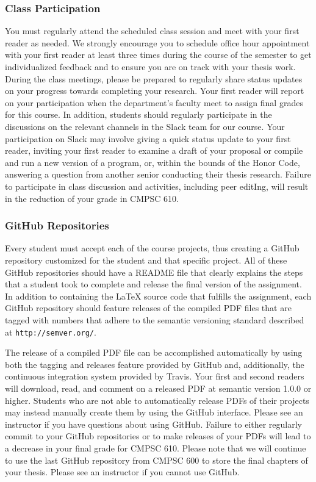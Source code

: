 \documentclass[11pt]{article}
\newcommand{\url}[1]{\lstinline{#1}}
\begin{document}
\subsubsection*{Class Participation}

You must regularly attend the scheduled class session and meet with your first
reader as needed. We strongly encourage you to schedule office hour
appointment with your first reader at least three times during the course
of the semester to get individualized feedback and to ensure you are
on track with your thesis work. During
the class meetings, please be prepared to regularly share status updates on your
progress towards completing your research. Your first reader will report on your 
participation when the department's faculty
meet to assign final grades for this course. In addition, students should regularly
participate in the discussions on the relevant channels in the Slack team for
our course. Your participation on Slack may involve giving a quick status
update to your first reader, inviting your first reader to examine a draft of
your proposal or compile and run a new version of a program, or, within the
bounds of the Honor Code, answering a question from another senior conducting
their thesis research.
Failure to participate in class discussion and activities, including peer editIng, 
will result in the reduction of your grade in CMPSC 610.

\subsubsection*{GitHub Repositories}

Every student must accept each of the course projects, thus creating a GitHub
repository customized for the student and that specific project. All of these
GitHub repositories should have a README file that clearly explains the steps
that a student took to complete and release the final version of the
assignment. In addition to containing the \LaTeX{} source code that fulfills
the assignment, each GitHub repository should feature releases of the compiled
PDF files that are tagged with numbers that adhere to the semantic versioning
standard described at \url{http://semver.org/}.

The release of a compiled PDF file can be accomplished automatically by using
both the tagging and releases feature provided by GitHub and, additionally, the
continuous integration system provided by Travis. Your first and second readers
will download, read, and comment on a released PDF at semantic version 1.0.0 or
higher. Students who are not able to automatically release PDFs of their
projects may instead manually create them by using the GitHub interface. Please
see an instructor if you have questions about using GitHub. Failure to either
regularly commit to your GitHub repositories or to make releases of your PDFs
will lead to a decrease in your final grade for CMPSC 610. Please note that we
will continue to use the last GitHub repository from CMPSC 600 to store the
final chapters of your thesis. Please see an instructor if you cannot use
GitHub.
\end{document}
